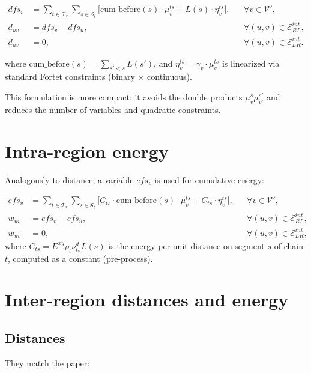 \documentclass[12pt]{article}
\begin{document}
\begin{align}
  dfs_v &= \sum_{t\in\mathcal T_r}\sum_{s\in\mathcal S_t}
          \bigl[ \text{cum\_before}(s) \cdot \mu_v^{ts}
          + L(s) \cdot \eta_v^{ts} \bigr],
          && \forall v\in\mathcal V', \tag{DFS}\\
  d_{uv} &= dfs_v - dfs_u,
          && \forall (u,v)\in\mathcal E_{RL}^{int}, \tag{IDIST}\\
  d_{uv} &= 0,
          && \forall (u,v)\in\mathcal E_{LR}^{int}. \tag{IDIST0}
\end{align}

where $\text{cum\_before}(s) = \sum_{s' < s} L(s')$, and $\eta_v^{ts} = \gamma_v \cdot \mu_v^{ts}$
is linearized via standard Fortet constraints (binary $\times$ continuous).

This formulation is more compact: it avoids the double products $\mu_v^s\mu_{v'}^{s'}$
and reduces the number of variables and quadratic constraints.

\section{Intra-region energy}

Analogously to distance, a variable $efs_v$ is used for cumulative energy:

\begin{align}
  efs_v &= \sum_{t\in\mathcal T_r}\sum_{s\in\mathcal S_t}
          \bigl[ C_{ts} \cdot \text{cum\_before}(s) \cdot \mu_v^{ts}
          + C_{ts} \cdot \eta_v^{ts} \bigr],
          && \forall v\in\mathcal V', \tag{EFS}\\
  w_{uv} &= efs_v - efs_u,
          && \forall (u,v)\in\mathcal E_{RL}^{int}, \tag{IENER}\\
  w_{uv} &= 0,
          && \forall (u,v)\in\mathcal E_{LR}^{int}, \tag{IENER0}
\end{align}
where $C_{ts} = E^{xy} \rho_t \nu_{ts}^d L(s)$ is the energy per unit
distance on segment $s$ of chain $t$, computed as a constant
(pre-process).

\section{Inter-region distances and energy}

\subsection*{Distances}
They match the paper:
\end{document}
